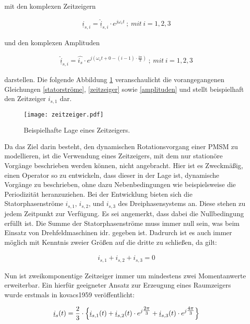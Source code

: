 mit den komplexen Zeitzeigern

\begin{align}
	\underline{i}_{s,i} = \underline{\hat i}_{s,i}\cdot e^{j\omega_{s}t}~;~mit~i=1,2,3 \label{zeitzeiger}
\end{align}

und den komplexen Amplituden

\begin{align}
	\underline{\hat i}_{s,i} = \hat{i_{s}}\cdot e^{j(\omega_{s}t+0-(i-1)\cdot\tfrac{2\pi}{3})}~;~mit~i=1,2,3 \label{amplituden}
\end{align}

darstellen. 
Die folgende Abbildung \ref{fig:zeitzeiger} veranschaulicht die vorangegangenen Gleichungen \ref{statorströme}, \ref{zeitzeiger} sowie \ref{amplituden} und stellt beispielhaft den Zeitzeiger $i_{s,1}$ dar.

\begin{figure}[h]
	\centering
	\texttt{[image: zeitzeiger.pdf]}
	\label{fig:zeitzeiger}
	\caption{Beispielhafte Lage eines Zeitzeigers.}
\end{figure}

Da das Ziel darin besteht, den dynamischen Rotationsvorgang einer PMSM zu modellieren, ist die Verwendung eines Zeitzeigers, mit dem nur stationöre Vorgänge beschrieben werden können, nicht angebracht. 
Hier ist es Zweckmäßig, einen Operator so zu entwickeln, dass dieser in der Lage ist, dynamische Vorgänge zu beschrieben, ohne dazu Nebenbedingungen wie beispielsweise die Periodizität heranzuziehen. 
Bei der Entwicklung bieten sich die Statorphasenströme $i_{s,1}$, $i_{s,2}$, und $i_{s,3}$ des Dreiphasensystems an.
Diese stehen zu jedem Zeitpunkt zur Verfügung. 
Es sei angemerkt, dass dabei die Nullbedingung erfüllt ist. 
Die Summe der Statorphasenströme muss immer null sein, was beim Einsatz von Drehfeldmaschinen idr. gegeben ist.
Dadrurch ist es auch immer möglich mit Kenntnis zweier Größen auf die dritte zu schließen, da gilt:

\begin{align}
	i_{s,1} + i_{s,2} + i_{s,3} = 0 
	\label{knotengleichung}
\end{align}


Nun ist zweikomponentige Zeitzeiger immer um mindestens zwei Momentanwerte erweiterbar. 
Ein hierfür geeigneter Ansatz zur Erzeugung eines Raumzeigers wurde erstmals in kovacs1959 veröffentlicht:

\begin{align}
	\underline{i}_{s}(t) = \frac{2}{3} \cdot \Bigl\{\underline{i}_{s,1}(t) + \underline{i}_{s,2}(t)\cdot e^{j\tfrac{2\pi}{3}} + \underline{i}_{s,3}(t)\cdot e^{j\tfrac{4\pi}{3}} \Bigr\} \label{statorstromzeiger}
\end{align}

